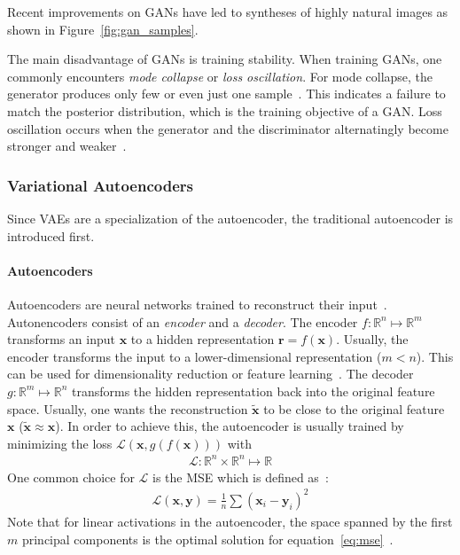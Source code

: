 Recent improvements on \acp{GAN} have led to syntheses of highly natural images as shown in Figure~\ref{fig:gan_samples}.

The main disadvantage of \acp{GAN} is training stability.
When training \acp{GAN}, one commonly encounters \textit{mode collapse} or \textit{loss oscillation}.
For mode collapse, the generator produces only few or even just one sample~\citep{che2016mode}.
This indicates a failure to match the posterior distribution, which is the training objective of a \ac{GAN}.
Loss oscillation occurs when the generator and the discriminator alternatingly become stronger and weaker~\citep{ham2020unbalanced}.

\subsubsection{Variational Autoencoders}\label{subsec:variational-autoencoders}

Since \acfp{VAE} are a specialization of the autoencoder, the traditional autoencoder is introduced first.

\paragraph{Autoencoders}

Autoencoders are neural networks trained to reconstruct their input~\citep[p. 499]{Goodfellow-et-al-2016}.
Autonencoders consist of an \textit{encoder} and a \textit{decoder}.
The encoder $f: \mathbb{R}^n \mapsto \mathbb{R}^m$ transforms an input $\bm{x}$ to a hidden representation $\bm{r} = f(\bm{x})$.
Usually, the encoder transforms the input to a lower-dimensional representation ($m < n$).
This can be used for dimensionality reduction or feature learning~\citep[p. 499]{Goodfellow-et-al-2016}.
The decoder $g: \mathbb{R}^m \mapsto \mathbb{R}^n$ transforms the hidden representation back into the original feature space.
Usually, one wants the reconstruction $\tilde{\bm{x}}$ to be close to the original feature $\bm{x}$ ($\tilde{\bm{x}} \approx \bm{x}$).
In order to achieve this, the autoencoder is usually trained by minimizing the loss $\mathcal{L}(\bm{x}, g(f(\bm{x})))$ with
\begin{align}
    \mathcal{L}: \mathbb{R}^n \times \mathbb{R}^n \mapsto \mathbb{R}
\end{align}
One common choice for $\mathcal{L}$ is the \ac{MSE} which is defined as~\citep[p. 106]{Goodfellow-et-al-2016}:
\begin{align}
    \mathcal{L}(\bm{x}, \bm{y}) = \frac{1}{n}\sum (\bm{x}_i - \bm{y}_i)^2 \label{eq:mse}
\end{align}
Note that for linear activations in the autoencoder, the space spanned by the first $m$ principal components is the optimal solution for equation~\ref{eq:mse}~\citep{chicco2014deep}.

